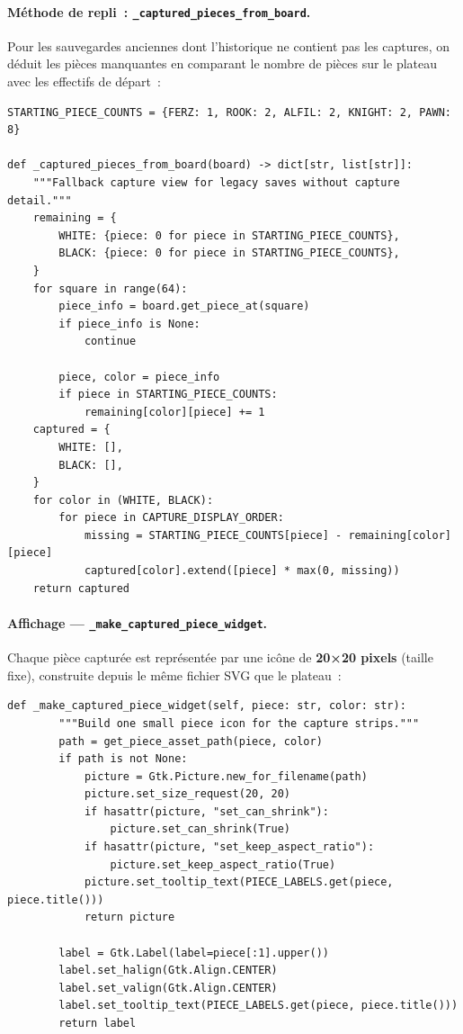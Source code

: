 \documentclass[a4paper,11pt]{article}
\begin{document}
\paragraph{Méthode de repli~: \texttt{\_captured\_pieces\_from\_board}.}
Pour les sauvegardes anciennes dont l'historique ne contient pas les captures,
on déduit les pièces manquantes en comparant le nombre de pièces sur le
plateau avec les effectifs de départ~:

\begin{verbatim}
STARTING_PIECE_COUNTS = {FERZ: 1, ROOK: 2, ALFIL: 2, KNIGHT: 2, PAWN: 8}

def _captured_pieces_from_board(board) -> dict[str, list[str]]:
    """Fallback capture view for legacy saves without capture detail."""
    remaining = {
        WHITE: {piece: 0 for piece in STARTING_PIECE_COUNTS},
        BLACK: {piece: 0 for piece in STARTING_PIECE_COUNTS},
    }
    for square in range(64):
        piece_info = board.get_piece_at(square)
        if piece_info is None:
            continue

        piece, color = piece_info
        if piece in STARTING_PIECE_COUNTS:
            remaining[color][piece] += 1
    captured = {
        WHITE: [],
        BLACK: [],
    }
    for color in (WHITE, BLACK):
        for piece in CAPTURE_DISPLAY_ORDER:
            missing = STARTING_PIECE_COUNTS[piece] - remaining[color][piece]
            captured[color].extend([piece] * max(0, missing))
    return captured
\end{verbatim}

\paragraph{Affichage --- \texttt{\_make\_captured\_piece\_widget}.}
Chaque pièce capturée est représentée par une icône de \textbf{20×20 pixels}
(taille fixe), construite depuis le même fichier SVG que le plateau~:

\begin{verbatim}
def _make_captured_piece_widget(self, piece: str, color: str):
        """Build one small piece icon for the capture strips."""
        path = get_piece_asset_path(piece, color)
        if path is not None:
            picture = Gtk.Picture.new_for_filename(path)
            picture.set_size_request(20, 20)
            if hasattr(picture, "set_can_shrink"):
                picture.set_can_shrink(True)
            if hasattr(picture, "set_keep_aspect_ratio"):
                picture.set_keep_aspect_ratio(True)
            picture.set_tooltip_text(PIECE_LABELS.get(piece, piece.title()))
            return picture

        label = Gtk.Label(label=piece[:1].upper())
        label.set_halign(Gtk.Align.CENTER)
        label.set_valign(Gtk.Align.CENTER)
        label.set_tooltip_text(PIECE_LABELS.get(piece, piece.title()))
        return label
\end{verbatim}
\end{document}
